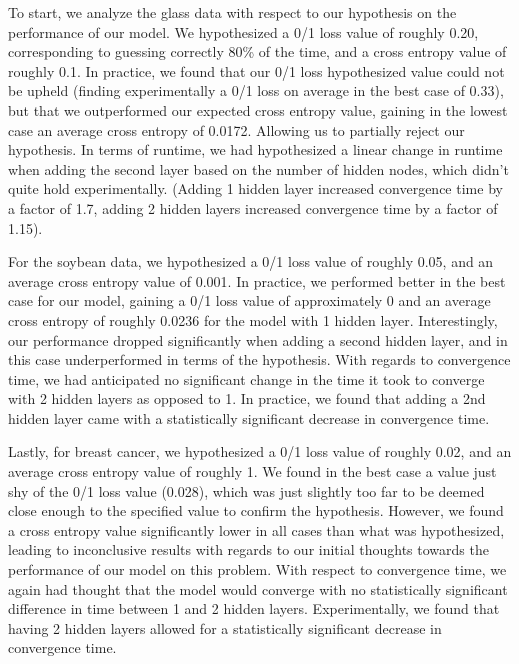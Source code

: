 \documentclass[twoside,11pt]{article}
\begin{document}
To start, we analyze the glass data with respect to our hypothesis on the performance of our model. We hypothesized a 0/1 loss value of roughly 0.20, corresponding
to guessing correctly 80\% of the time, and a cross entropy value of roughly 0.1. In practice, we found that our 0/1 loss hypothesized value could not be upheld (finding
experimentally a 0/1 loss on average in the best case of 0.33),
but that we outperformed our expected cross entropy value, gaining in the lowest case an average cross entropy of 0.0172. Allowing us to partially reject our
hypothesis. In terms of runtime,
we had hypothesized a linear change in runtime when adding the second layer based on the number of hidden nodes, which didn't quite hold experimentally.
(Adding 1 hidden layer increased convergence time by a factor of 1.7, adding 2 hidden layers increased convergence time by a factor of 1.15).



For the soybean data, we hypothesized a 0/1 loss value of roughly 0.05, and an average cross entropy value of 0.001. In practice, we performed 
better in the best case for our model,
gaining a 0/1 loss value of approximately 0 and an average cross entropy of roughly 0.0236 for the model with 1 hidden layer. Interestingly, our
performance dropped significantly when adding a second hidden layer, and in this case underperformed in terms of the hypothesis. With regards to
convergence time, we had anticipated no significant change in the time it took to converge with 2 hidden layers as opposed to 1. In practice, we
found that adding a 2nd hidden layer came with a statistically significant decrease in convergence time.

Lastly, for breast cancer, we hypothesized a 0/1 loss value of roughly 0.02, and an average cross entropy value of roughly 1. We found in the best case a value
just shy of the 0/1 loss value (0.028), which was just slightly too far to be deemed close enough to the specified value to confirm the hypothesis. However,
we found a cross entropy value significantly lower in all cases than what was hypothesized, leading to inconclusive results with regards
to our initial thoughts towards the performance of our model on this problem. With respect to convergence time, we again had thought that the model would converge
with no statistically significant difference in time between 1 and 2 hidden layers. Experimentally, we found that having 2 hidden layers allowed for a statistically
significant decrease in convergence time.
\end{document}
